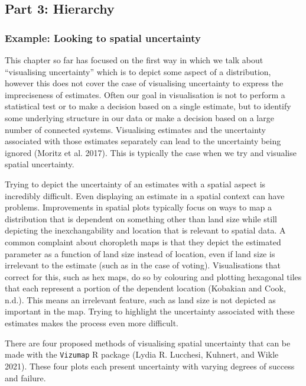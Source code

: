 \documentclass[
  letterpaper,
  DIV=11,
  numbers=noendperiod]{scrartcl}
\begin{document}
\hypertarget{part-3-hierarchy}{%
\subsection{Part 3: Hierarchy}\label{part-3-hierarchy}}

\hypertarget{example-looking-to-spatial-uncertainty}{%
\subsubsection{Example: Looking to spatial
uncertainty}\label{example-looking-to-spatial-uncertainty}}

This chapter so far has focused on the first way in which we talk about
``visualising uncertainty'' which is to depict some aspect of a
distribution, however this does not cover the case of visualising
uncertainty to express the impreciseness of estimates. Often our goal in
visualisation is not to perform a statistical test or to make a decision
based on a single estimate, but to identify some underlying structure in
our data or make a decision based on a large number of connected
systems. Visualising estimates and the uncertainty associated with those
estimates separately can lead to the uncertainty being ignored (Moritz
et al. 2017). This is typically the case when we try and visualise
spatial uncertainty.

Trying to depict the uncertainty of an estimates with a spatial aspect
is incredibly difficult. Even displaying an estimate in a spatial
context can have problems. Improvements in spatial plots typically focus
on ways to map a distribution that is dependent on something other than
land size while still depicting the inexchangability and location that
is relevant to spatial data. A common complaint about choropleth maps is
that they depict the estimated parameter as a function of land size
instead of location, even if land size is irrelevant to the estimate
(such as in the case of voting). Visualisations that correct for this,
such as hex maps, do so by colouring and plotting hexagonal tiles that
each represent a portion of the dependent location (Kobakian and Cook,
n.d.). This means an irrelevant feature, such as land size is not
depicted as important in the map. Trying to highlight the uncertainty
associated with these estimates makes the process even more difficult.

There are four proposed methods of visualising spatial uncertainty that
can be made with the \texttt{Vizumap} R package (Lydia R. Lucchesi,
Kuhnert, and Wikle 2021). These four plots each present uncertainty with
varying degrees of success and failure.
\end{document}
